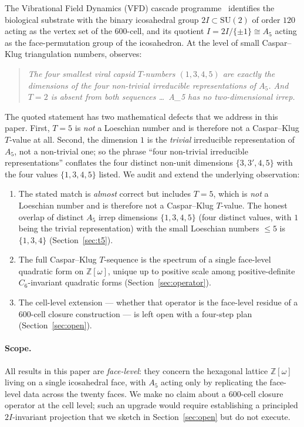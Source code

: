 \documentclass[12pt]{article}
\newcommand{\Zom}{\mathbb{Z}[\omega]}
\begin{document}
The Vibrational Field Dynamics (VFD) cascade programme~\cite{CascadeBio}
identifies the biological substrate with the binary icosahedral group
$2I \subset \mathrm{SU}(2)$ of order $120$ acting as the vertex set of
the 600-cell, and its quotient $I = 2I/\{\pm 1\} \cong A_5$ acting as
the face-permutation group of the icosahedron. At the level of small
Caspar--Klug triangulation numbers, \cite{CascadeBio} observes:
\begin{quote}\it
The four smallest viral capsid $T$-numbers $(1, 3, 4, 5)$ are exactly
the dimensions of the four non-trivial irreducible representations of
$A_5$. And $T = 2$ is absent from both sequences \ldots\ A_5 has no
two-dimensional irrep.
\end{quote}
The quoted statement has two mathematical defects that we address in
this paper. First, $T = 5$ is \emph{not} a Loeschian number and is
therefore not a Caspar--Klug $T$-value at all. Second, the
dimension $1$ is the \emph{trivial} irreducible representation of
$A_5$, not a non-trivial one; so the phrase ``four non-trivial
irreducible representations'' conflates the four distinct non-unit
dimensions $\{3, 3', 4, 5\}$ with the four values $\{1, 3, 4, 5\}$
listed. We audit and extend the underlying observation:
\begin{enumerate}
\item[(i)] The stated match is \emph{almost} correct but includes
$T = 5$, which is \emph{not} a Loeschian number and is therefore
not a Caspar--Klug $T$-value. The honest overlap of distinct $A_5$
irrep dimensions $\{1, 3, 4, 5\}$ (four distinct values, with $1$
being the trivial representation) with the small Loeschian numbers
$\le 5$ is $\{1, 3, 4\}$ (Section~\ref{sec:t5}).
\item[(ii)] The full Caspar--Klug $T$-sequence is the spectrum of
a single face-level quadratic form on $\Zom$, unique up to positive
scale among positive-definite $C_6$-invariant quadratic forms
(Section~\ref{sec:operator}).
\item[(iii)] The cell-level extension --- whether that operator is
the face-level residue of a 600-cell closure construction --- is
left open with a four-step plan (Section~\ref{sec:open}).
\end{enumerate}

\paragraph{Scope.} All results in this paper are \emph{face-level}:
they concern the hexagonal lattice $\Zom$ living on a single
icosahedral face, with $A_5$ acting only by replicating the face-level
data across the twenty faces. We make no claim about a 600-cell
closure operator at the cell level; such an upgrade would require
establishing a principled $2I$-invariant projection that we sketch in
Section~\ref{sec:open} but do not execute.
\end{document}
